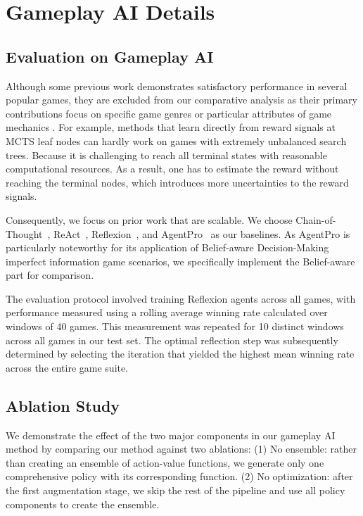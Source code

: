 \section{Gameplay AI Details}




\subsection{Evaluation on Gameplay AI}
\label{sup:game-ai-eval}

Although some previous work demonstrates satisfactory performance in several popular games, they are excluded from our comparative analysis as their primary contributions focus on specific game genres \cite{wang2023avalon} or particular attributes of game mechanics \cite{light2024strategist}. For example, methods that learn directly from reward signals at MCTS leaf nodes \cite{light2024strategist} can hardly work on games with extremely unbalanced search trees. Because it is challenging to reach all terminal states with reasonable computational resources. As a result, one has to estimate the reward without reaching the terminal nodes, which introduces more uncertainties to the reward signals. 


Consequently, we focus on prior work that are scalable. We choose Chain-of-Thought~\cite{CoT}, ReAct~\cite{yao_react_2023}, Reflexion~\cite{shinn_reflexion_2023}, and AgentPro~\cite{zhang2024agentpro} as our baselines. As AgentPro is particularly noteworthy for its application of Belief-aware Decision-Making imperfect information game scenarios, we specifically implement the Belief-aware part for comparison.

The evaluation protocol involved training Reflexion agents across all games, with performance measured using a rolling average winning rate calculated over windows of 40 games. This measurement was repeated for 10 distinct windows across all games in our test set. The optimal reflection step was subsequently determined by selecting the iteration that yielded the highest mean winning rate across the entire game suite.




\subsection{Ablation Study}

We demonstrate the effect of the two major components in our gameplay AI method by comparing our method against two ablations: (1) No ensemble: rather than creating an ensemble of action-value functions, we generate only one comprehensive policy with its corresponding function. (2) No optimization: after the first augmentation stage, we skip the rest of the pipeline and use all policy components to create the ensemble. 

